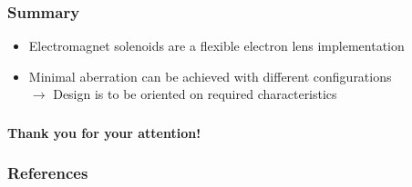 \documentclass[10pt]{beamer}
\newcommand{\rarrow}{$\rightarrow$ }
\newcommand{\rfn}{\setcounter{footnote}{0}}
\begin{document}
\begin{frame}
\begin{frame}
\end{frame}

\begin{frame}
  \frametitle{Summary}
  \rfn
  \begin{itemize}
    \item Electromagnet solenoids are a flexible electron lens implementation
    \vspace{1cm}
    \item Minimal aberration can be achieved with different configurations\\
      \rarrow Design is to be oriented on required characteristics
  \end{itemize}

\end{frame}

\begin{frame}
  \frametitle{}
  \textbf{Thank you for your attention!}
\end{frame}

\begin{frame}[allowframebreaks]
  \frametitle{References}
  \printbibliography
\end{frame}
\end{document}
